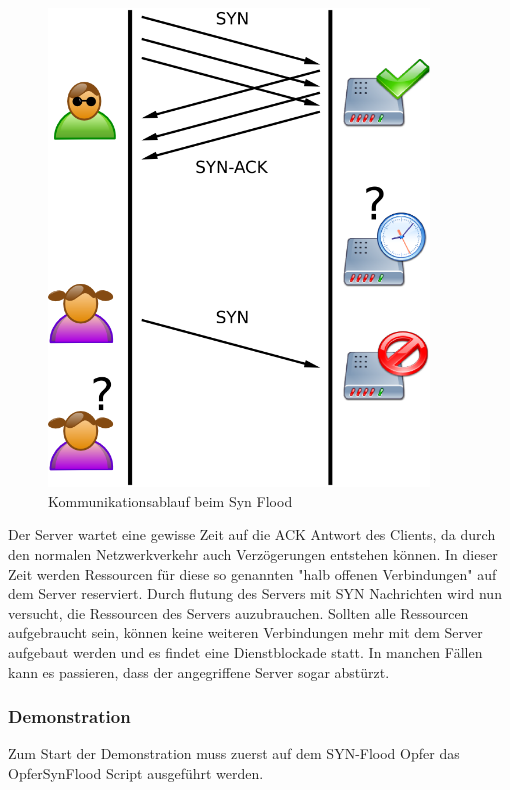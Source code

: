 	\begin{figure}[H]
		\centering
		\includegraphics[width=0.9\textwidth]{images/DOS/syn_flood_theorie.png}
		\caption{Kommunikationsablauf beim Syn Flood}
		\label{fig:syn flood theorie}
	\end{figure}
Der Server wartet eine gewisse Zeit auf die ACK Antwort des Clients, da durch den normalen Netzwerkverkehr auch Verzögerungen entstehen können. In dieser Zeit werden Ressourcen für diese so genannten "halb offenen Verbindungen" auf dem Server reserviert. Durch flutung des Servers mit SYN Nachrichten wird nun versucht, die Ressourcen des Servers auzubrauchen. Sollten alle Ressourcen aufgebraucht sein, können keine weiteren Verbindungen mehr mit dem Server aufgebaut werden und es findet eine Dienstblockade statt.
In manchen Fällen kann es passieren, dass der angegriffene Server sogar abstürzt.

\subsubsection{Demonstration}

Zum Start der Demonstration muss zuerst auf dem SYN-Flood Opfer das OpferSynFlood Script ausgeführt werden.  

